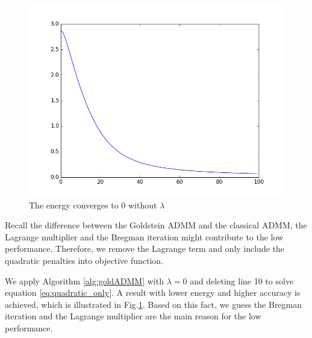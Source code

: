 \documentclass[letterpaper, 10 pt, conference]{ieeeconf}  %
\begin{document}
\begin{figure}
\centering
\includegraphics[width=\columnwidth]{figure/energy_no_lambda.png}
\caption{The energy converges to 0 without $\lambda$}
\label{fig:energyWithoutLambda}
\end{figure}

Recall the difference between the Goldstein ADMM and the classical ADMM, the Lagrange multiplier and the Bregman iteration might contribute to the low performance. Therefore, we remove the Lagrange term and only include the quadratic penalties into objective function.

We apply Algorithm \ref{alg:goldADMM} with $\lambda=0$ and deleting line 10 to solve equation \eqref{eq:quadratic_only}. A result with lower energy and higher accuracy is achieved, which is illustrated in Fig.\ref{fig:energyWithoutLambda}. Based on this fact, we guess the Bregman iteration and the Lagrange multiplier are the main reason for the low performance.
\end{document}
